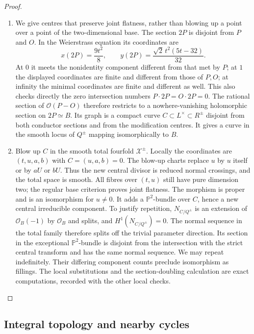 \begin{proof}
\begin{enumerate}[label=\arabic*.,leftmargin=*]
\item We give centres that preserve joint flatness, rather than
blowing up a point over a point of the two-dimensional base.
The section $2P$ is disjoint from $P$ and $O$. In the
Weierstrass equation its coordinates are
\[
 x(2P)=\frac{9t^2}{8},\qquad
 y(2P)=\frac{\sqrt2\,t^2(5t-32)}{32}.
\]
At $0$ it meets the nonidentity component different from
that met by $P$; at $1$ the displayed coordinates are finite
and different from those of $P,O$; at infinity the minimal
coordinates are finite and different as well. This also
checks directly the zero intersection numbers
$P\cdot2P=O\cdot2P=0$. The rational section of
$\mathcal O(P-O)$ therefore restricts to a nowhere-vanishing
holomorphic section on $2P\simeq B$. Its graph is a compact
curve $C\subset L^\times\subset R^\pm$ disjoint from both
conductor sections and from the modification centres.
It gives a curve in the smooth locus of $Q^\pm$ mapping
isomorphically to $B$.

\item Blow up $C$ in the smooth total fourfold $\mathcal X^\pm$.
Locally the coordinates are $(t,u,a,b)$ with
$C=(u,a,b)=0$. The blow-up charts replace $u$ by $u$ itself
or by $aU$ or $bU$. Thus the new central divisor is reduced
normal crossings, and the total space is smooth. All fibres
over $(t,u)$ still have pure dimension two; the regular base
criterion proves joint flatness. The morphism is proper and
is an isomorphism for $u\ne0$. It adds a
$\mathbb P^2$-bundle over $C$, hence a new central irreducible
component. To justify repetition, $N_{C/Q^\pm}$ is an extension
of $\mathcal O_B(-1)$ by $\mathcal O_B$ and splits, and
$H^1(N_{C/Q^\pm})=0$. The normal sequence in the total family
therefore splits off the trivial parameter direction. Its
section in the exceptional $\mathbb P^2$-bundle is disjoint
from the intersection with the strict central transform and
has the same normal sequence. We may repeat indefinitely.
Their differing component counts preclude
isomorphism as fillings. The local substitutions and the
section-doubling calculation are exact computations, recorded
with the other local checks.
\end{enumerate}
\end{proof}

\subsection{Integral topology and nearby cycles}\label{push:section:A.4}


